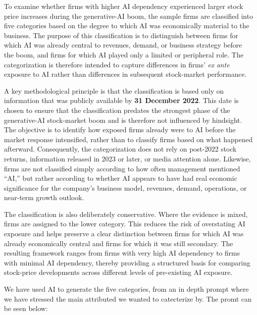 \documentclass{article}
\begin{document}
To examine whether firms with higher AI dependency experienced larger stock price increases during the generative-AI boom, the sample firms are classified into five categories based on the degree to which AI was economically material to the business. The purpose of this classification is to distinguish between firms for which AI was already central to revenues, demand, or business strategy before the boom, and firms for which AI played only a limited or peripheral role. The categorization is therefore intended to capture differences in firms’ \textit{ex ante} exposure to AI rather than differences in subsequent stock-market performance.

A key methodological principle is that the classification is based only on information that was publicly available by \textbf{31 December 2022}. This date is chosen to ensure that the classification predates the strongest phase of the generative-AI stock-market boom and is therefore not influenced by hindsight. The objective is to identify how exposed firms already were to AI before the market response intensified, rather than to classify firms based on what happened afterward. Consequently, the categorization does not rely on post-2022 stock returns, information released in 2023 or later, or media attention alone. Likewise, firms are not classified simply according to how often management mentioned ``AI,'' but rather according to whether AI appears to have had real economic significance for the company’s business model, revenues, demand, operations, or near-term growth outlook.

The classification is also deliberately conservative. Where the evidence is mixed, firms are assigned to the lower category. This reduces the risk of overstating AI exposure and helps preserve a clear distinction between firms for which AI was already economically central and firms for which it was still secondary. The resulting framework ranges from firms with very high AI dependency to firms with minimal AI dependency, thereby providing a structured basis for comparing stock-price developments across different levels of pre-existing AI exposure.

We have used AI to generate the five categories, from an in depth prompt where we have stressed the main attributed we wanted to catecterize by. The promt can be seen below: 
\end{document}
